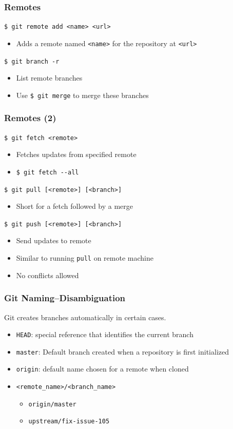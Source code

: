 \documentclass[english,compress]{beamer}
\begin{document}
\begin{frame}[fragile]
    \frametitle{Remotes}

    \verb|$ git remote add <name> <url>|
    \begin{itemize}
        \item Adds a remote named \verb|<name>| for the repository at \verb|<url>|
    \end{itemize}

    \verb|$ git branch -r |
    \begin{itemize}
        \item List remote branches
        \item Use \verb|$ git merge| to merge these branches
    \end{itemize}
\end{frame}

\begin{frame}[fragile]
    \frametitle{Remotes (2)}

    \verb|$ git fetch <remote>|
    \begin{itemize}
        \item Fetches updates from specified remote
        \item \verb|$ git fetch --all|
    \end{itemize}

    \verb|$ git pull [<remote>] [<branch>]|
    \begin{itemize}
        \item Short for a fetch followed by a merge
    \end{itemize}

    \verb|$ git push [<remote>] [<branch>]|
    \begin{itemize}
        \item Send updates to remote
        \item Similar to running \verb|pull| on remote machine
        \item No conflicts allowed
    \end{itemize}
\end{frame}

\begin{frame}[fragile]
    \frametitle{Git Naming--Disambiguation}
    Git creates branches automatically in certain cases.
    \begin{itemize}
        \item \verb|HEAD|: special reference that identifies the current branch
        \item \verb|master|: Default branch created when a repository is first
            initialized
        \item \verb|origin|: default name chosen for a remote when cloned
        \item \verb|<remote_name>/<branch_name>|
            \begin{itemize}
                \item \verb|origin/master|
                \item \verb|upstream/fix-issue-105|
            \end{itemize}
    \end{itemize}
\end{frame}
\end{document}
